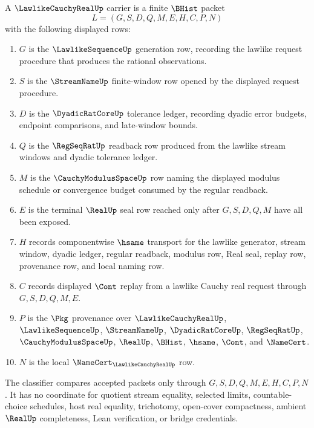 \begin{definition}
\label{def:lawlike-cauchy-real-carrier}
A $\LawlikeCauchyRealUp$ carrier is a finite $\BHist$ packet
$$
L=(G,S,D,Q,M,E,H,C,P,N)
$$
with the following displayed rows:
\begin{enumerate}
\item $G$ is the $\LawlikeSequenceUp$ generation row, recording the lawlike request procedure that produces the rational observations.
\item $S$ is the $\StreamNameUp$ finite-window row opened by the displayed request procedure.
\item $D$ is the $\DyadicRatCoreUp$ tolerance ledger, recording dyadic error budgets, endpoint comparisons, and late-window bounds.
\item $Q$ is the $\RegSeqRatUp$ readback row produced from the lawlike stream windows and dyadic tolerance ledger.
\item $M$ is the $\CauchyModulusSpaceUp$ row naming the displayed modulus schedule or convergence budget consumed by the regular readback.
\item $E$ is the terminal $\RealUp$ seal row reached only after $G,S,D,Q,M$ have all been exposed.
\item $H$ records componentwise $\hsame$ transport for the lawlike generator, stream window, dyadic ledger, regular readback, modulus row, Real seal, replay row, provenance row, and local naming row.
\item $C$ records displayed $\Cont$ replay from a lawlike Cauchy real request through $G,S,D,Q,M,E$.
\item $P$ is the $\Pkg$ provenance over $\LawlikeCauchyRealUp$, $\LawlikeSequenceUp$, $\StreamNameUp$, $\DyadicRatCoreUp$, $\RegSeqRatUp$, $\CauchyModulusSpaceUp$, $\RealUp$, $\BHist$, $\hsame$, $\Cont$, and $\NameCert$.
\item $N$ is the local $\NameCert_{\LawlikeCauchyRealUp}$ row.
\end{enumerate}
The classifier compares accepted packets only through $G,S,D,Q,M,E,H,C,P,N$. It has no coordinate for quotient stream equality, selected limits, countable-choice schedules, host real equality, trichotomy, open-cover compactness, ambient $\RealUp$ completeness, Lean verification, or bridge credentials.
\end{definition}

